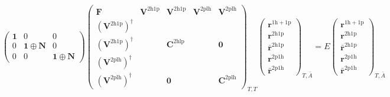 \begin{equation}
\begin{pmatrix}
\bm{1} & 0 & 0 \\
0 & \bm{1} \oplus \bm{N} & 0 \\
0 & 0 & \bm{1} \oplus \bm{N}
\end{pmatrix}
\begin{pmatrix}
\bm{F} & \bm{V}^{2\mathrm{h1p}} & \bm{V}^{2\mathrm{h1p}} & \bm{V}^{2\mathrm{plh}} & \bm{V}^{2\mathrm{plh}} \\
\left(\bm{V}^{2\mathrm{h1p}}\right)^{\dagger} &  &  & & \\
\left(\bm{V}^{2\mathrm{h1p}}\right)^{\dagger} &  & \bm{C}^{2\mathrm{hlp}} & & \bm{0} \\
\left(\bm{V}^{2\mathrm{plh}}\right)^{\dagger} & & & & \\
\left(\bm{V}^{2\mathrm{plh}}\right)^{\dagger} &  & \bm{0} & & \bm{C}^{2\mathrm{plh}}
\end{pmatrix}_{T,T}
\begin{pmatrix}
\bm{r}^{1\mathrm{h}+1\mathrm{p}} \\
\bm{r}^{2\mathrm{h}1\mathrm{p}} \\
\bm{\bar{r}}^{2\mathrm{h}1\mathrm{p}} \\
\bm{r}^{2\mathrm{p}1\mathrm{h}} \\
\bm{\bar{r}}^{2\mathrm{p}1\mathrm{h}}
\end{pmatrix}_{T,\bar{A}} = E
\begin{pmatrix}
\bm{r}^{1\mathrm{h}+1\mathrm{p}} \\
\bm{r}^{2\mathrm{h}1\mathrm{p}} \\
\bm{\bar{r}}^{2\mathrm{h}1\mathrm{p}} \\
\bm{r}^{2\mathrm{p}1\mathrm{h}} \\
\bm{\bar{r}}^{2\mathrm{p}1\mathrm{h}}
\end{pmatrix}_{T,\bar{A}}
\end{equation}

